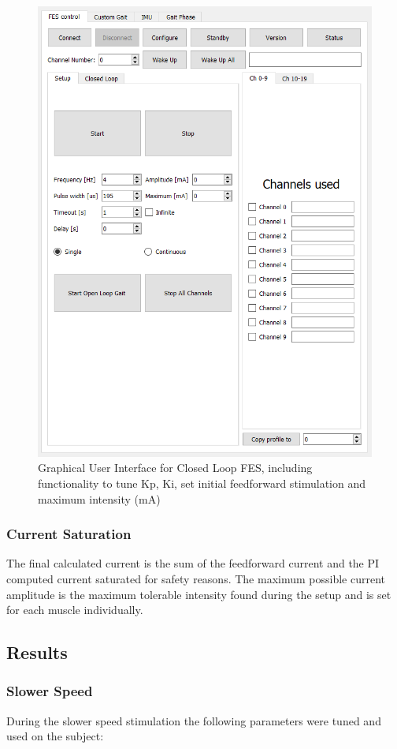 \begin{figure}
    \centering
    \includegraphics[width=0.65\linewidth]{images/clgui.png}
    \caption{Graphical User Interface for Closed Loop FES, including functionality to tune Kp, Ki, set initial feedforward stimulation and maximum intensity (mA)}
    \label{fig:clsetup}
\end{figure}

\subsubsection{Current Saturation}
The final calculated current is the sum of the feedforward current and the PI computed current saturated for safety reasons. The maximum possible current amplitude is the maximum tolerable intensity found during the setup and is set for each muscle individually. 

\subsection{Results}
\subsubsection{Slower Speed}
During the slower speed stimulation the following parameters were tuned and used on the subject:

